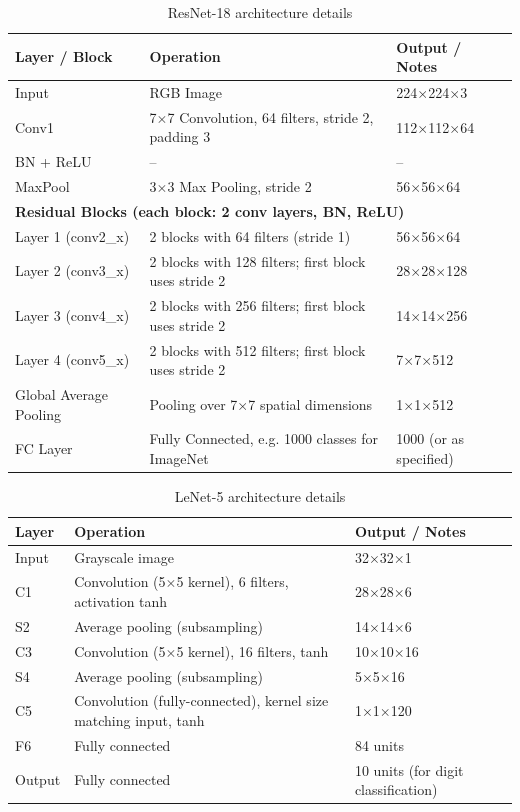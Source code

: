 \documentclass{article}
\begin{document}
\begin{table}[H]
\centering
\caption{ResNet-18 architecture details}
\label{tab:resnet18}
\begin{tabular}{l l l}
\hline
\textbf{Layer / Block} & \textbf{Operation} & \textbf{Output / Notes} \\
\hline
Input & RGB Image & 224$\times$224$\times$3 \\
\hline
Conv1 & 7$\times$7 Convolution, 64 filters, stride 2, padding 3 & 112$\times$112$\times$64 \\
BN + ReLU & -- & -- \\
MaxPool & 3$\times$3 Max Pooling, stride 2 & 56$\times$56$\times$64 \\
\hline
\multicolumn{3}{l}{\textbf{Residual Blocks (each block: 2 conv layers, BN, ReLU)}} \\
Layer 1 (conv2\_x) & 2 blocks with 64 filters (stride 1) & 56$\times$56$\times$64 \\
Layer 2 (conv3\_x) & 2 blocks with 128 filters; first block uses stride 2 & 28$\times$28$\times$128 \\
Layer 3 (conv4\_x) & 2 blocks with 256 filters; first block uses stride 2 & 14$\times$14$\times$256 \\
Layer 4 (conv5\_x) & 2 blocks with 512 filters; first block uses stride 2 & 7$\times$7$\times$512 \\
\hline
Global Average Pooling & Pooling over 7$\times$7 spatial dimensions & 1$\times$1$\times$512 \\
FC Layer & Fully Connected, e.g. 1000 classes for ImageNet & 1000 (or as specified) \\
\hline
\end{tabular}
\end{table}




\begin{table}[H]
\centering
\caption{LeNet-5 architecture details}
\label{tab:resnet181}
\begin{tabular}{l l l}
\hline
\textbf{Layer} & \textbf{Operation} & \textbf{Output / Notes} \\
\hline
Input & Grayscale image & 32$\times$32$\times$1 \\
\hline
C1 & Convolution (5$\times$5 kernel), 6 filters, activation tanh & 28$\times$28$\times$6 \\
S2 & Average pooling (subsampling) & 14$\times$14$\times$6 \\
C3 & Convolution (5$\times$5 kernel), 16 filters, tanh & 10$\times$10$\times$16 \\
S4 & Average pooling (subsampling) & 5$\times$5$\times$16 \\
C5 & Convolution (fully-connected), kernel size matching input, tanh & 1$\times$1$\times$120 \\
F6 & Fully connected & 84 units \\
Output & Fully connected & 10 units (for digit classification) \\
\hline
\end{tabular}
\end{table}
\end{document}
